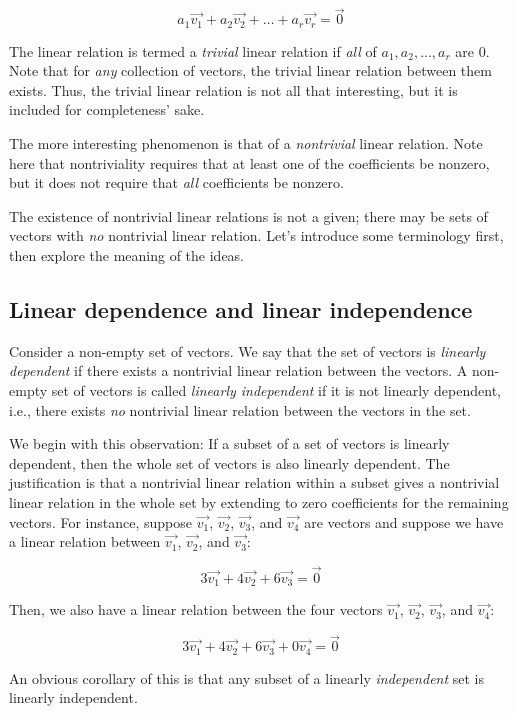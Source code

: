 \documentclass[10pt]{amsart}
\begin{document}
$$a_1\vec{v_1} + a_2\vec{v_2} + \dots + a_r\vec{v_r} = \vec{0}$$

The linear relation is termed a {\em trivial} linear relation if {\em
  all} of $a_1,a_2,\dots,a_r$ are $0$. Note that for {\em any}
collection of vectors, the trivial linear relation between them
exists. Thus, the trivial linear relation is not all that interesting,
but it is included for completeness' sake.

The more interesting phenomenon is that of a {\em nontrivial} linear
relation. Note here that nontriviality requires that at least one of
the coefficients be nonzero, but it does not require that {\em all}
coefficients be nonzero.

The existence of nontrivial linear relations is not a given;
there may be sets of vectors with {\em no} nontrivial linear
relation. Let's introduce some terminology first, then explore the
meaning of the ideas.

\subsection{Linear dependence and linear independence}

Consider a non-empty set of vectors. We say that the set of vectors is
{\em linearly dependent} if there exists a nontrivial linear relation
between the vectors. A non-empty set of vectors is called {\em
  linearly independent} if it is not linearly dependent, i.e., there
exists {\em no} nontrivial linear relation between the vectors in the
set.

We begin with this observation: If a subset of a set of vectors is
linearly dependent, then the whole set of vectors is also linearly
dependent. The justification is that a nontrivial linear relation
within a subset gives a nontrivial linear relation in the whole set by
extending to zero coefficients for the remaining vectors. For
instance, suppose $\vec{v_1}$, $\vec{v_2}$, $\vec{v_3}$, and
$\vec{v_4}$ are vectors and suppose we have a linear relation between
$\vec{v_1}$, $\vec{v_2}$, and $\vec{v_3}$:

$$3\vec{v_1} + 4\vec{v_2} + 6\vec{v_3} = \vec{0}$$

Then, we also have a linear relation between the four vectors
$\vec{v_1}$, $\vec{v_2}$, $\vec{v_3}$, and $\vec{v_4}$:

$$3\vec{v_1} + 4\vec{v_2} + 6\vec{v_3} + 0\vec{v_4} = \vec{0}$$

An obvious corollary of this is that any subset of a linearly {\em
  independent} set is linearly independent.
\end{document}
